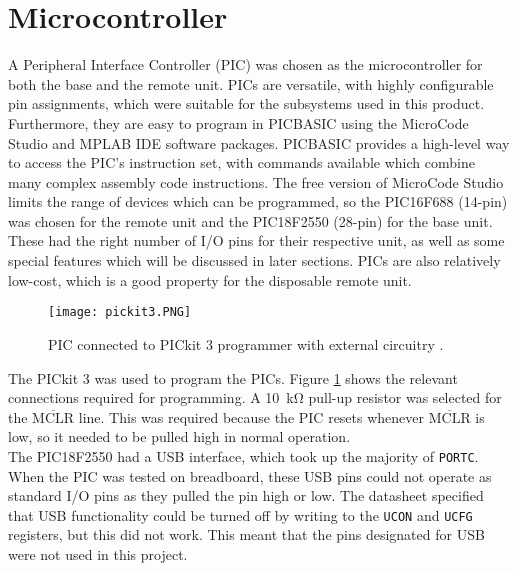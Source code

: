 \section{Microcontroller}
A Peripheral Interface Controller (PIC) was chosen as the microcontroller for both the base and the remote unit. PICs are versatile, with highly configurable pin assignments, which were suitable for the subsystems used in this product. Furthermore, they are easy to program in PICBASIC using the MicroCode Studio \cite{microcode_studio} and MPLAB IDE software packages. PICBASIC provides a high-level way to access the PIC's instruction set, with commands available which combine many complex assembly code instructions. The free version of MicroCode Studio limits the range of devices which can be programmed, so the PIC16F688 (14-pin) \cite{pic16f688} was chosen for the remote unit and the PIC18F2550 (28-pin) \cite{pic18f2550} for the base unit. These had the right number of I/O pins for their respective unit, as well as some special features which will be discussed in later sections. PICs are also relatively low-cost, which is a good property for the disposable remote unit.\\

\begin{figure}[htb]
	\centering
	\texttt{[image: pickit3.PNG]}
	\caption{PIC connected to PICkit 3 programmer with external circuitry \cite{pickit3}.}
	\label{fig: pickit3}
\end{figure}

The PICkit 3 \cite{pickit3} was used to program the PICs. Figure \ref{fig: pickit3} shows the relevant connections required for programming. A \SI{10}{\kilo\ohm} pull-up resistor was selected for the $\overline{\text{MCLR}}$ line. This was required because the PIC resets whenever $\overline{\text{MCLR}}$ is low, so it needed to be pulled high in normal operation. \\

The PIC18F2550 had a USB interface, which took up the majority of \verb|PORTC|. When the PIC was tested on breadboard, these USB pins could not operate as standard I/O pins as they pulled the pin high or low. The datasheet specified that USB functionality could be turned off by writing to the \verb|UCON| and \verb|UCFG| registers, but this did not work. This meant that the pins designated for USB were not used in this project.
